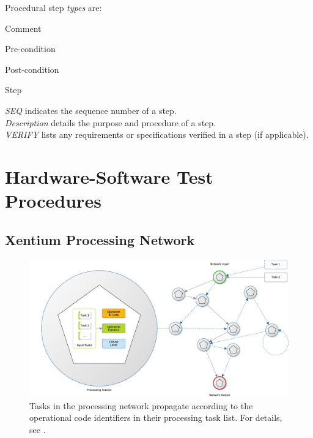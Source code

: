 \noindent
Procedural step \emph{types} are:
\begin{description}[labelwidth=4em,leftmargin=\parindent,labelindent=\parindent]
	\item[\textbf{CMT}]	Comment
	\item[\textbf{PRE}]	Pre-condition
	\item[\textbf{PST}]	Post-condition
	\item[\textbf{STP}]	Step
\end{description}


\noindent
\emph{SEQ} indicates the sequence number of a step.\\

\noindent
\emph{Description} details the purpose and procedure of a step. \\

\noindent
\emph{VERIFY} lists any requirements or specifications verified in a 
step (if applicable).\\

\newpage
\section{Hardware-Software Test Procedures}

\subsection{Xentium Processing Network}

\begin{figure}%
\begin{center}
	\includegraphics[width=1.0\columnwidth]{../usermanual/images/task_network}
	\caption{Tasks in the processing network propagate according to the
		 operational code identifiers in their processing task list.
	 	 For details, see \cite{flightosUM}.}
	\label{fig:task_network}
\end{center}
\end{figure}

